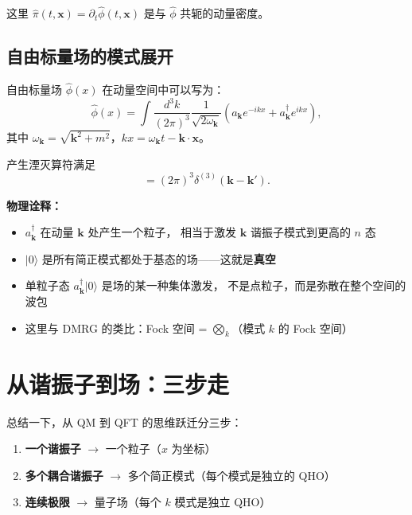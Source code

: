 \documentclass[12pt,a4paper]{article}
\begin{document}
这里 $\hat\pi(t,\mathbf{x}) = \partial_t \hat\phi(t,\mathbf{x})$ 是与 $\hat\phi$ 共轭的动量密度。

\subsection{自由标量场的模式展开}

自由标量场 $\hat\phi(x)$ 在动量空间中可以写为：
\begin{equation}
\hat\phi(x) = \int \frac{d^3k}{(2\pi)^3} \frac{1}{\sqrt{2\omega_{\mathbf{k}}}}
\left( a_{\mathbf{k}} e^{-ikx} + a_{\mathbf{k}}^\dagger e^{ikx} \right),
\label{eq:field-expansion}
\end{equation}
其中 $\omega_{\mathbf{k}} = \sqrt{\mathbf{k}^2 + m^2}$，$kx = \omega_{\mathbf{k}}t - \mathbf{k}\cdot\mathbf{x}$。

产生湮灭算符满足
\begin{equation}
[a_{\mathbf{k}}, a_{\mathbf{k}'}^\dagger] = (2\pi)^3 \delta^{(3)}(\mathbf{k} - \mathbf{k}').
\label{eq:comm-continuum}
\end{equation}

\textbf{物理诠释：}
\begin{itemize}[nosep]
\item $a_{\mathbf{k}}^\dagger$ 在动量 $\mathbf{k}$ 处产生一个粒子，
相当于激发 $\mathbf{k}$ 谐振子模式到更高的 $n$ 态
\item $|0\rangle$ 是所有简正模式都处于基态的场——这就是\textbf{真空}
\item 单粒子态 $a_{\mathbf{k}}^\dagger |0\rangle$ 是场的某一种集体激发，
不是点粒子，而是弥散在整个空间的波包
\item 这里与 DMRG 的类比：Fock 空间 = $\bigotimes_k$（模式 $k$ 的 Fock 空间）
\end{itemize}

\section{从谐振子到场：三步走}

总结一下，从 QM 到 QFT 的思维跃迁分三步：

\begin{enumerate}[nosep]
\item \textbf{一个谐振子} $\to$ 一个粒子（$x$ 为坐标）
\item \textbf{多个耦合谐振子} $\to$ 多个简正模式（每个模式是独立的 QHO）
\item \textbf{连续极限} $\to$ 量子场（每个 $k$ 模式是独立 QHO）
\end{enumerate}
\end{document}
